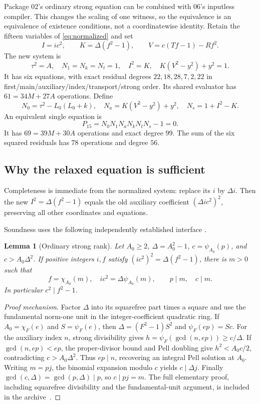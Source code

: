 \documentclass[11pt,a4paper]{article}
\newtheorem{lemma}[theorem]{Lemma}
\theoremstyle{remark}\newtheorem{remark}[theorem]{Remark}
\begin{document}
Package 02's ordinary strong equation can be combined with 06's inputless
compiler. This changes the scaling of one witness, so the equivalence is
an equivalence of existence conditions, not a coordinatewise identity.
Retain the fifteen variables of \eqref{eq:normalized} and set
\[
 I=ic^2,\qquad K=\Delta(f^2-1),\qquad V=c(Tf-1)-Rf^2.
\]
The new system is
\begin{equation}
 \boxed{\quad
 \tau^2=A,\quad N_1=N_k=N_t=1,\quad
 I^2=K,\quad K(V^2-y^2)+y^2=1.\quad}
 \label{eq:ordinary}
\end{equation}
It has six equations, with exact residual degrees
$22,18,28,7,2,22$ in first/main/auxiliary/index/transport/strong order.
Its shared evaluator has $61=34M+27A$ operations. Define
\[
 N_0=\tau^2-L_0(L_0+k),\quad
 N_a=K(V^2-y^2)+y^2,\quad N_s=1+I^2-K.
\]
An equivalent single equation is
\begin{equation}
 \boxed{\quad P_{15}=N_0N_1N_aN_kN_tN_s-1=0.\quad}
 \label{eq:P15}
\end{equation}
It has $69=39M+30A$ operations and exact degree $99$.
The sum of the six squared residuals has $78$ operations and degree $56$.

\subsection{Why the relaxed equation is sufficient}
Completeness is immediate from the normalized system: replace its
$i$ by $\Delta i$. Then the new $I^2=\Delta(f^2-1)$ equals the
old auxiliary coefficient $(\Delta ic^2)^2$, preserving all other
coordinates and equations.

Soundness uses the following independently established interface
\cite{ordinary,relaxed}.
\begin{lemma}[Ordinary strong rank]\label{lem:ordinaryrank}
Let $A_0\ge2$, $\Delta=A_0^2-1$, $c=\psi_{A_0}(p)$, and
$c>A_0\Delta^2$. If positive integers $i,f$ satisfy
$(ic^2)^2=\Delta(f^2-1)$, there is $m>0$ such that
\[
 f=\chi_{A_0}(m),\quad ic^2=\Delta\psi_{A_0}(m),
 \qquad p\mid m,\quad c\mid m.
\]
In particular $c^2\mid f^2-1$.
\end{lemma}
\begin{proof}[Proof mechanism]
Factor $\Delta$ into its squarefree part times a square and use the
fundamental norm-one unit in the integer-coefficient quadratic ring.
If $A_0=\chi_F(e)$ and $S=\psi_F(e)$, then
$\Delta=(F^2-1)S^2$ and $\psi_F(ep)=Sc$.
For the auxiliary index $n$, strong divisibility gives
$h=\psi_F(\gcd(n,ep))\ge c/\Delta$. If $\gcd(n,ep)<ep$,
the proper-divisor bound and Pell doubling give
$h^2<A_0c/2$, contradicting $c>A_0\Delta^2$.
Thus $ep\mid n$, recovering an integral Pell solution at $A_0$.
Writing $m=pj$, the binomial expansion modulo $c$ yields
$c\mid\Delta j$. Finally
$\gcd(c,\Delta)=\gcd(p,\Delta)\mid p$, so $c\mid pj=m$.
The full elementary proof, including squarefree divisibility and the
fundamental-unit argument, is included in the archive~\cite{relaxed}.
\end{proof}
\end{document}
